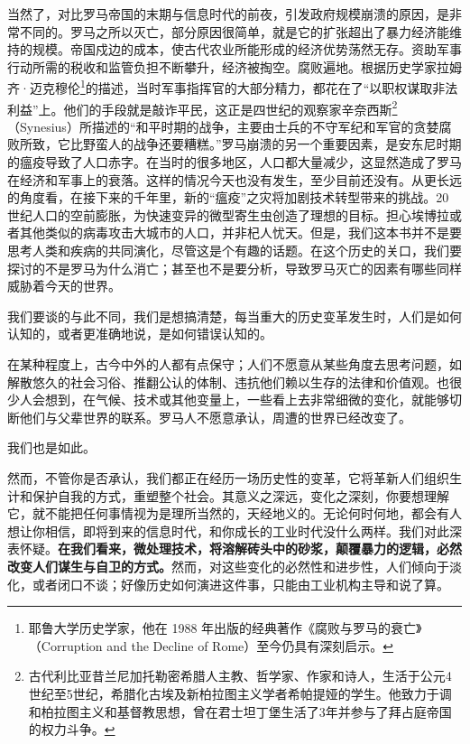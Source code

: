 当然了，对比罗马帝国的末期与信息时代的前夜，引发政府规模崩溃的原因，是非常不同的。罗马之所以灭亡，部分原因很简单，就是它的扩张超出了暴力经济能维持的规模。帝国戍边的成本，使古代农业所能形成的经济优势荡然无存。资助军事行动所需的税收和监管负担不断攀升，经济被掏空。腐败遍地。根据历史学家拉姆齐·迈克穆伦\footnote{耶鲁大学历史学家，他在 1988 年出版的经典著作《腐败与罗马的衰亡》（Corruption and the Decline of Rome）至今仍具有深刻启示。}的描述，当时军事指挥官的大部分精力，都花在了“以职权谋取非法利益”上。他们的手段就是敲诈平民，这正是四世纪的观察家辛奈西斯\footnote{古代利比亚昔兰尼加托勒密希腊人主教、哲学家、作家和诗人，生活于公元4世纪至5世纪，希腊化古埃及新柏拉图主义学者希帕提娅的学生。他致力于调和柏拉图主义和基督教思想，曾在君士坦丁堡生活了3年并参与了拜占庭帝国的权力斗争。}（Synesius）所描述的“和平时期的战争，主要由士兵的不守军纪和军官的贪婪腐败所致，它比野蛮人的战争还要糟糕。”罗马崩溃的另一个重要因素，是安东尼时期的瘟疫导致了人口赤字。在当时的很多地区，人口都大量减少，这显然造成了罗马在经济和军事上的衰落。这样的情况今天也没有发生，至少目前还没有。从更长远的角度看，在接下来的千年里，新的“瘟疫”之灾将加剧技术转型带来的挑战。20 世纪人口的空前膨胀，为快速变异的微型寄生虫创造了理想的目标。担心埃博拉或者其他类似的病毒攻击大城市的人口，并非杞人忧天。但是，我们这本书并不是要思考人类和疾病的共同演化，尽管这是个有趣的话题。在这个历史的关口，我们要探讨的不是罗马为什么消亡；甚至也不是要分析，导致罗马灭亡的因素有哪些同样威胁着今天的世界。

我们要谈的与此不同，我们是想搞清楚，每当重大的历史变革发生时，人们是如何认知的，或者更准确地说，是如何错误认知的。

在某种程度上，古今中外的人都有点保守；人们不愿意从某些角度去思考问题，如解散悠久的社会习俗、推翻公认的体制、违抗他们赖以生存的法律和价值观。也很少人会想到，在气候、技术或其他变量上，一些看上去非常细微的变化，就能够切断他们与父辈世界的联系。罗马人不愿意承认，周遭的世界已经改变了。

我们也是如此。

然而，不管你是否承认，我们都正在经历一场历史性的变革，它将革新人们组织生计和保护自我的方式，重塑整个社会。其意义之深远，变化之深刻，你要想理解它，就不能把任何事情视为是理所当然的，天经地义的。无论何时何地，都会有人想让你相信，即将到来的信息时代，和你成长的工业时代没什么两样。我们对此深表怀疑。\textbf{在我们看来，微处理技术，将溶解砖头中的砂浆，颠覆暴力的逻辑，必然改变人们谋生与自卫的方式。}然而，对这些变化的必然性和进步性，人们倾向于淡化，或者闭口不谈；好像历史如何演进这件事，只能由工业机构主导和说了算。

